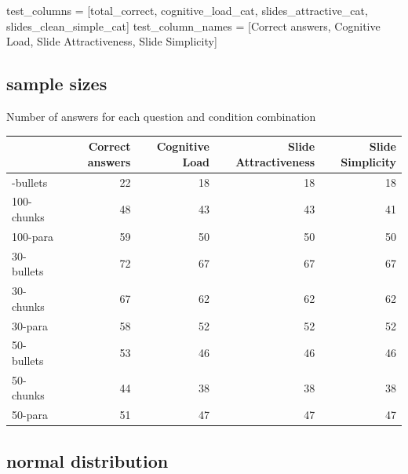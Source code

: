 \documentclass[
  letterpaper,
  DIV=11,
  numbers=noendperiod]{scrartcl}
\newenvironment{Shaded}{\begin{snugshade}}{\end{snugshade}}
\newcommand{\NormalTok}[1]{\textcolor[rgb]{0.00,0.23,0.31}{#1}}
\newcommand{\OperatorTok}[1]{\textcolor[rgb]{0.37,0.37,0.37}{#1}}
\newcommand{\StringTok}[1]{\textcolor[rgb]{0.13,0.47,0.30}{#1}}
\newcounter{none} %
\begin{document}
\begin{Shaded}
\begin{Highlighting}[]
\NormalTok{test\_columns }\OperatorTok{=}\NormalTok{ [}\StringTok{\textquotesingle{}total\_correct\textquotesingle{}}\NormalTok{, }
  \StringTok{\textquotesingle{}cognitive\_load\_cat\textquotesingle{}}\NormalTok{, }
  \StringTok{\textquotesingle{}slides\_attractive\_cat\textquotesingle{}}\NormalTok{, }
  \StringTok{\textquotesingle{}slides\_clean\_simple\_cat\textquotesingle{}}\NormalTok{]}
\NormalTok{test\_column\_names }\OperatorTok{=}\NormalTok{ [}\StringTok{\textquotesingle{}Correct answers\textquotesingle{}}\NormalTok{, }
  \StringTok{\textquotesingle{}Cognitive Load\textquotesingle{}}\NormalTok{, }
  \StringTok{\textquotesingle{}Slide Attractiveness\textquotesingle{}}\NormalTok{, }
  \StringTok{\textquotesingle{}Slide Simplicity\textquotesingle{}}\NormalTok{]}
\end{Highlighting}
\end{Shaded}

\subsection{sample sizes}\label{sample-sizes}

Number of answers for each question and condition combination

{\def\LTcaptype{none} %
\begin{longtable}[]{@{}lrrrr@{}}
\toprule\noalign{}
& Correct answers & Cognitive Load & Slide Attractiveness & Slide
Simplicity \\
\midrule\noalign{}
\endhead
\bottomrule\noalign{}
\endlastfoot
100-bullets & 22 & 18 & 18 & 18 \\
100-chunks & 48 & 43 & 43 & 41 \\
100-para & 59 & 50 & 50 & 50 \\
30-bullets & 72 & 67 & 67 & 67 \\
30-chunks & 67 & 62 & 62 & 62 \\
30-para & 58 & 52 & 52 & 52 \\
50-bullets & 53 & 46 & 46 & 46 \\
50-chunks & 44 & 38 & 38 & 38 \\
50-para & 51 & 47 & 47 & 47 \\
\end{longtable}
}

\subsection{normal distribution}\label{normal-distribution}
\end{document}
